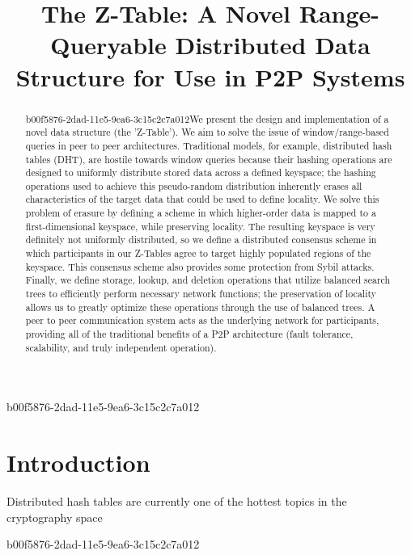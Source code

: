 \documentclass[12pt]{article}
\title{The Z-Table: A Novel Range-Queryable Distributed Data Structure for Use in P2P Systems}
\begin{document}
b00f5876-2dad-11e5-9ea6-3c15c2c7a012\maketitle

\begin{abstract}
b00f5876-2dad-11e5-9ea6-3c15c2c7a012We present the design and implementation of a novel data structure (the 'Z-Table'). We aim to solve the issue of window/range-based queries in peer to peer architectures. Traditional models, for example,  distributed hash tables (DHT), are hostile towards window queries because their hashing operations are designed to uniformly distribute stored data across a defined keyspace; the hashing operations used to achieve this pseudo-random distribution inherently erases all characteristics of the target data that could be used to define locality. We solve this problem of erasure by defining a scheme in which higher-order data is mapped to a first-dimensional keyspace, while preserving locality. The resulting keyspace is very definitely not uniformly distributed, so we define a distributed consensus scheme in which participants in our Z-Tables agree to target highly populated regions of the keyspace. This consensus scheme also provides some protection from Sybil attacks. Finally, we define storage, lookup, and deletion operations that utilize balanced search trees to efficiently perform necessary network functions; the preservation of locality allows us to greatly optimize these operations through the use of balanced trees. A peer to peer communication system acts as the underlying network for participants, providing all of the traditional benefits of a P2P architecture (fault tolerance, scalability, and truly independent operation).
\end{abstract}


\newpage
\section{Introduction}
Distributed hash tables are currently one of the hottest topics in the cryptography space~\cite{Stoica:2001dj,Rowstron:2001ea,Ratnasamy:2001wn}

b00f5876-2dad-11e5-9ea6-3c15c2c7a012\printbibliography
\end{document}
